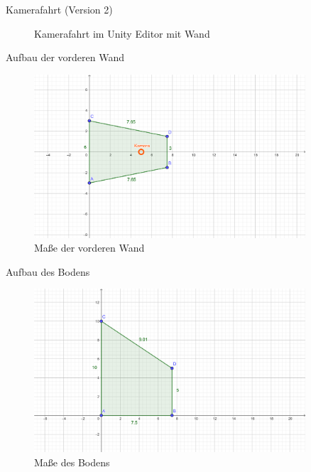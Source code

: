 \documentclass{beamer}
\begin{document}
\begin{frame}{Kamerafahrt (Version 2)}
\begin{figure}
    \centering
\caption{Kamerafahrt im Unity Editor mit Wand}
\end{figure}
\end{frame}


\begin{frame}{Aufbau der vorderen Wand}
\begin{figure}
    \centering
\includegraphics[width=0.9\textwidth, keepaspectratio]{geogebra-export_Vorderseite}
\caption{Maße der vorderen Wand}
\end{figure}
\end{frame}


\begin{frame}{Aufbau des Bodens}
\begin{figure}
    \centering
\includegraphics[width=0.9\textwidth, keepaspectratio]{geogebra-export_Boden}
\caption{Maße des Bodens}
\end{figure}
\end{frame}
\end{document}
